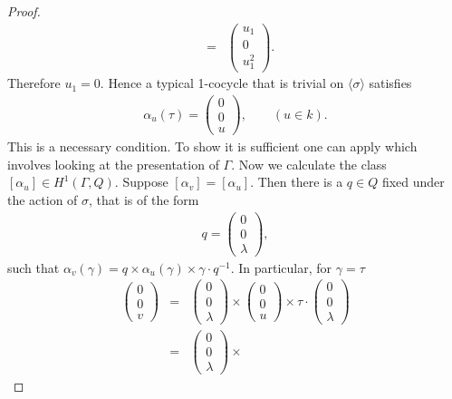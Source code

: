 \begin{proof}
\begin{eqnarray*}
		&=& \left(\begin{matrix} u_1 \\ 0 \\ u_1^2\end{matrix} \right).
	\end{eqnarray*}
	Therefore $u_1 = 0$. Hence a typical 1-cocycle that is trivial on $\langle \sigma \rangle$ satisfies
	\begin{eqnarray*}
		\alpha_u(\tau) = \left(\begin{matrix} 0 \\ 0 \\ u \end{matrix} \right),\qquad (u\in k).
	\end{eqnarray*}
	This is a necessary condition. To show it is sufficient one can apply \cite[Proposition 2]{martin2004nonab} which involves looking at the presentation of $\Gamma$.
	Now we calculate the class $[\alpha_u] \in H^1(\Gamma, Q)$. Suppose $[\alpha_v] = [\alpha_u]$. Then
	there is a $q\in Q$ fixed under the action of $\sigma$, that is of the form
	\begin{eqnarray*}
		q = \left(\begin{matrix} 0 \\ 0 \\ \lambda\end{matrix}\right),
	\end{eqnarray*}
	such that $\alpha_v(\gamma) = q\times\alpha_u(\gamma)\times\gamma\cdot q^{-1}$. In particular, for $\gamma = \tau$
	\begin{eqnarray*}
		\left(\begin{matrix} 0 \\ 0 \\ v\end{matrix}\right) &=&
		\left(\begin{matrix} 0 \\ 0 \\ \lambda\end{matrix}\right) \times
		\left(\begin{matrix} 0 \\ 0 \\ u\end{matrix}\right) \times
		\tau\cdot\left(\begin{matrix} 0 \\ 0 \\ \lambda\end{matrix}\right)\\
		&=&
		\left(\begin{matrix} 0 \\ 0 \\ \lambda\end{matrix}\right) \times

\end{eqnarray*}
\end{proof}
